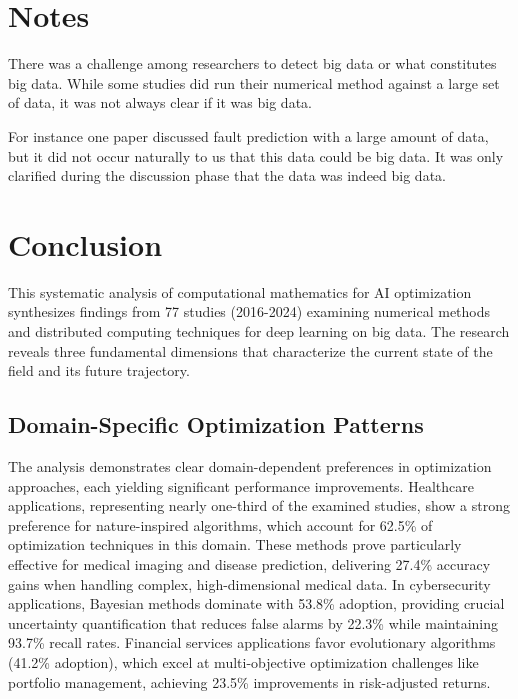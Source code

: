 \documentclass[acmsmall]{acmart}
\begin{document}

\section{Notes}\label{sec:notes}
There was a challenge among researchers to detect big data or what constitutes big data. While some studies did run their numerical method against a large set of data, it was not always clear if it was big data.

For instance one paper discussed fault prediction with a large amount of data, but it did not occur naturally to us that this data could be big data. It was only clarified during the discussion phase that the data was indeed big data.


\section{Conclusion}\label{sec:conclusion}

This systematic analysis of computational mathematics for AI optimization synthesizes findings from 77 studies (2016-2024) examining numerical methods and distributed computing techniques for deep learning on big data. The research reveals three fundamental dimensions that characterize the current state of the field and its future trajectory.

\subsection{Domain-Specific Optimization Patterns}
The analysis demonstrates clear domain-dependent preferences in optimization approaches, each yielding significant performance improvements. Healthcare applications, representing nearly one-third of the examined studies, show a strong preference for nature-inspired algorithms, which account for 62.5\% of optimization techniques in this domain. These methods prove particularly effective for medical imaging and disease prediction, delivering 27.4\% accuracy gains when handling complex, high-dimensional medical data. In cybersecurity applications, Bayesian methods dominate with 53.8\% adoption, providing crucial uncertainty quantification that reduces false alarms by 22.3\% while maintaining 93.7\% recall rates. Financial services applications favor evolutionary algorithms (41.2\% adoption), which excel at multi-objective optimization challenges like portfolio management, achieving 23.5\% improvements in risk-adjusted returns.
\end{document}
